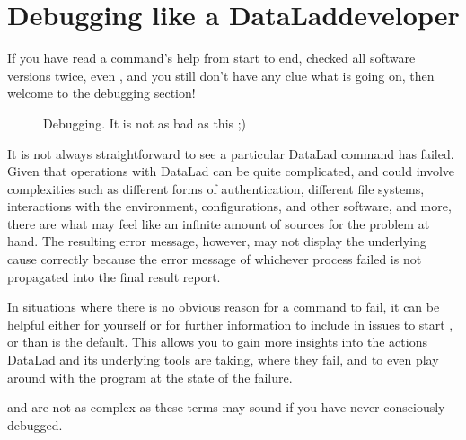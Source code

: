 \ignorespaces 

\section{Debugging like a DataLad\sphinxhyphen{}developer}
\label{\detokenize{basics/101-135-help:debugging-like-a-datalad-developer}}\label{\detokenize{basics/101-135-help:index-2}}
\sphinxAtStartPar
If you have read a command’s help from start to end, checked all software versions twice, even , and you still don’t have any clue what is going on, then welcome to the debugging section!

\begin{figure}[tbp]
\centering
\capstart

\noindent{}
\caption{Debugging. It is not as bad as this ;\sphinxhyphen{})}\label{\detokenize{basics/101-135-help:id4}}\end{figure}

\sphinxAtStartPar
It is not always straightforward to see  a particular DataLad command has failed.
Given that operations with DataLad can be quite complicated, and could involve complexities such as different forms of authentication, different file systems, interactions with the environment, configurations, and other software, and  more, there are what may feel like an infinite amount of sources for the problem at hand.
The resulting error message, however, may not display the underlying cause correctly because the error message of whichever process failed is not propagated into the final result report.

\sphinxAtStartPar
In situations where there is no obvious reason for a command to fail, it can be helpful \textendash{} either for yourself or for further information to include in {\hyperref[\detokenize{glossary:term-GitHub}]{}} issues \textendash{} to start , or  than is the default.
This allows you to gain more insights into the actions DataLad and its underlying tools are taking, where  they fail, and to even play around with the program at the state of the failure.

\sphinxAtStartPar
{\hyperref[\detokenize{glossary:term-debugging}]{}} and {\hyperref[\detokenize{glossary:term-logging}]{}} are not as complex as these terms may sound if you have never consciously debugged.

